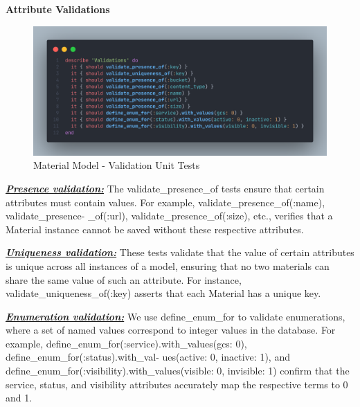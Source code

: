 \begin{justify}
\vspace{0.25cm}
\newendline
\textbf{Attribute Validations}


    \begin{figure}[H]
        \centerline{\includegraphics[width=140mm,scale=1]{figures/implementation_and_testing/testing/AUT/material/validations.png}}
        \caption{Material Model - Validation Unit Tests}
        \label{Material Model - Validation Unit Tests}
    \end{figure}

\vspace{0.25cm}
\noindent\textbf{\textit{\underline{Presence validation:}}} The validate\_presence\_of tests ensure that certain attributes must contain values. For example, validate\_presence\_of(:name), validate\_presence- \_of(:url), validate\_presence\_of(:size), etc., verifies that a Material instance cannot be saved without these respective attributes.

\vspace{0.25cm}
\noindent\textbf{\textit{\underline{Uniqueness validation:}}} These tests validate that the value of certain attributes is unique across all instances of a model, ensuring that no two materials can share the same value of such an attribute. For instance, validate\_uniqueness\_of(:key) asserts that each Material has a unique key.

\vspace{0.25cm}
\noindent\textbf{\textit{\underline{Enumeration validation:}}} We use define\_enum\_for to validate enumerations, where a set of named values correspond to integer values in the database. For example, define\_enum\_for(:service).with\_values(gcs: 0), define\_enum\_for(:status).with\_val- ues(active: 0, inactive: 1), and define\_enum\_for(:visibility).with\_values(visible: 0, invisible: 1) confirm that the service, status, and visibility attributes accurately map the respective terms to 0 and 1.\\


\end{justify}
